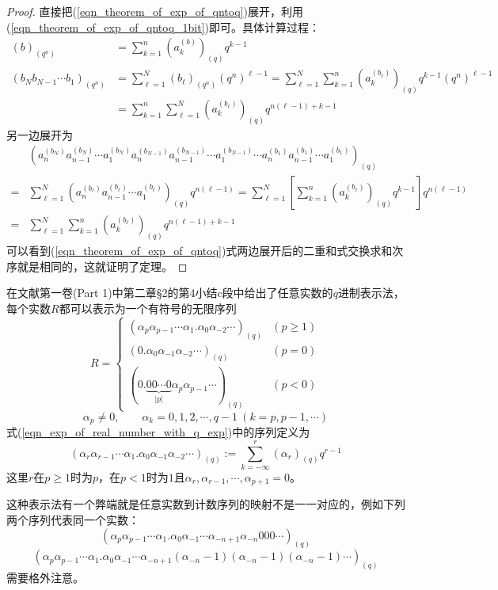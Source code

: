 \begin{proof}
    直接把(\ref{eqn_theorem_of_exp_of_qntoq})展开，利用(\ref{eqn_theorem_of_exp_of_qntoq_1bit})即可。具体计算过程：
    \[\begin{split}
        (b)_{(q^n)}&=\sum_{k=1}^n \left(a_k^{(b)}\right)_{(q)} q^{k-1}\\
        (b_Nb_{N-1}\cdots b_1)_{(q^n)}&=\sum_{\ell=1}^N(b_\ell)_{(q^n)}(q^n)^{\ell-1}=\sum_{\ell=1}^N\sum_{k=1}^n \left(a_k^{(b_\ell)}\right)_{(q)} q^{k-1}(q^n)^{\ell-1}\\
        &=\sum_{k=1}^n\sum_{\ell=1}^N \left(a_k^{(b_\ell)}\right)_{(q)} q^{n(\ell-1)+k-1}
    \end{split}\]
    另一边展开为
    \[\begin{split}
        &\left(a^{(b_N)}_{n}a^{(b_N)}_{n-1}\cdots a^{(b_N)}_1a^{(b_{N-1})}_{n}a^{(b_{N-1})}_{n-1}\cdots a^{(b_{N-1})}_1\cdots a^{(b_1)}_{n}a^{(b_1)}_{n-1}\cdots a^{(b_1)}_1\right)_{(q)}\\
        =&\sum_{\ell=1}^N\left(a^{(b_\ell)}_{n}a^{(b_\ell)}_{n-1}\cdots a^{(b_\ell)}_1\right)_{(q)} q^{n(\ell-1)}=\sum_{\ell=1}^N\left[\sum_{k=1}^n\left(a^{(b_\ell)}_{k}\right)_{(q)} q^{k-1}\right] q^{n(\ell-1)}\\
        =&\sum_{\ell=1}^N\sum_{k=1}^n \left(a_k^{(b_\ell)}\right)_{(q)} q^{n(\ell-1)+k-1}
    \end{split}\]
    可以看到(\ref{eqn_theorem_of_exp_of_qntoq})式两边展开后的二重和式交换求和次序就是相同的，这就证明了定理。
\end{proof}
\par 在文献\cite{Zorich:MA}第一卷(Part 1)中第二章\S 2的第4小结c段中给出了任意实数的$q$进制表示法，每个实数$R$都可以表示为一个有符号的无限序列
\begin{equation}\label{eqn_exp_of_real_number_with_q_exp}
    R=\begin{cases}
        (\alpha_p\alpha_{p-1}\cdots\alpha_1.\alpha_{0}\alpha_{-2}\cdots)_{(q)}&(p\geq 1)\\
        (0.\alpha_0\alpha_{-1}\alpha_{-2}\cdots)_{(q)}&(p=0)\\
        (0.\underbrace{00\cdots 0}_{|p|}\alpha_p\alpha_{p-1}\cdots)_{(q)}&(p<0)
    \end{cases}
\end{equation}
$$\alpha_p\neq 0,\qquad\alpha_k=0,1,2,\cdots,q-1\ (k=p,p-1,\cdots)$$
式(\ref{eqn_exp_of_real_number_with_q_exp})中的序列定义为
$$(\alpha_r\alpha_{r-1}\cdots\alpha_1.\alpha_0\alpha_{-1}\alpha_{-2}\cdots)_{(q)}:=\sum_{k=-\infty}^r\left(\alpha_r\right)_{(q)} q^{r-1}$$
这里$r$在$p\geq 1$时为$p$，在$p<1$时为$1$且$\alpha_r,\alpha_{r-1},\cdots,\alpha_{p+1}=0$。
\par 这种表示法有一个弊端就是任意实数到计数序列的映射不是一一对应的，例如下列两个序列代表同一个实数：
$$\left(\alpha_p\alpha_{p-1}\cdots\alpha_{1}.\alpha_{0}\alpha_{-1}\cdots\alpha_{-n+1}\alpha_{-n}000\cdots\right)_{(q)}$$
$$\left(\alpha_p\alpha_{p-1}\cdots\alpha_{1}.\alpha_{0}\alpha_{-1}\cdots\alpha_{-n+1}(\alpha_{-n}-1)(\alpha_{-n}-1)(\alpha_{-n}-1)\cdots\right)_{(q)}$$
需要格外注意。

